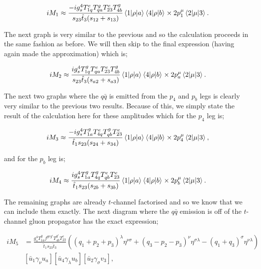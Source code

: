 \begin{equation}
iM_1 \approx  \frac{- i g_s^4 T^e_{1q}T^g_{qa}T^e_{23}T^g_{4b}}{s_{23} \hat{t}_3 (s_{12} + s_{13})} \mathinner{\langle1\vert\rho\vert a\rangle}_{} \mathinner{\langle4\vert\rho\vert b\rangle}_{} \times 2p_1^\mu \mathinner{\langle2\vert\mu\vert3\rangle}_{}.
\end{equation} 

The next graph is very similar to the previous and so the calculation proceeds in the same fashion as before. We will then skip to the final expression (having again made the approximation) which is;

\begin{equation}
iM_2 \approx \frac{ i g_s^4 T^g_{1q}T^e_{qa}T^e_{23}T^g_{4b}}{s_{23} \hat{t}_3 (s_{a2}+s_{a3})} \mathinner{\langle1\vert\rho\vert a\rangle}_{} \mathinner{\langle4\vert\rho\vert b\rangle}_{}\times 2p_a^\mu \mathinner{\langle2\vert\mu\vert3\rangle}_{}.
\end{equation}    

The next two graphs where the $q \bar{q}$ is emitted from the $p_4$ and $p_b$ legs is clearly very similar to the previous two results. Because of this, we simply state the result of the calculation here for these amplitudes which for the $p_4$ leg is;

\begin{equation}
iM_3 \approx \frac{-i g_s^4 T^g_{1a} T^e_{4q}T^g_{qb}T^e_{23}}{\hat{t}_1 s_{23}(s_{24}+s_{34})}\mathinner{\langle1\vert\rho\vert a\rangle}_{} \mathinner{\langle4\vert\rho\vert b\rangle}_{} \times 2 p_4^\mu \mathinner{\langle2\vert\mu\vert3\rangle}_{},
\end{equation}

and for the $p_b$ leg is;

\begin{equation}
iM_4 \approx \frac{i g_s^4 T^g_{1a} T^g_{4q} T^e_{qb} T^e_{23}}{\hat{t}_1 s_{23}(s_{2b}+s_{3b})} \mathinner{\langle1\vert\rho\vert a\rangle}_{} \mathinner{\langle4\vert\rho\vert b\rangle}_{} \times 2 p_b^\mu \mathinner{\langle2\vert\mu\vert3\rangle}_{}.
\end{equation}

The remaining graphs are already $t$-channel factorised and so we know that we can include them exactly. The next diagram where the $q \bar{q}$ emission is off of the $t$-channel gluon propagator has the exact expression;

\begin{equation}
\begin{split}
iM_5 &= \frac{g_s^4 T^g_{1a} f^{geg'}T^{g'}_{4b}T^e_{23}}{\hat{t}_1 s_{23} \hat{t}_3} \left((q_1 + p_2 + p_3)^\lambda \eta^{\nu \sigma} + (q_3 - p_2 -p_3)^\nu \eta^{\sigma \lambda} - (q_1 + q_3)^\sigma \eta^{\nu \lambda} \right) \\
& \left[\bar{u}_1 \gamma_\nu u_a \right]  \left[\bar{u}_4 \gamma_\lambda u_b \right] \left[\bar{u}_2 \gamma_\sigma v_3 \right],
\end{split}
\end{equation}

